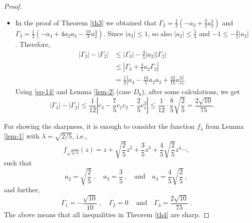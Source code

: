 \documentclass{amsart}
\begin{document}
\begin{proof}
\begin{itemize}
\medskip

  \item[(ii)]  In the proof of Theorem \ref{th3} we obtained that $\Gamma_{2}=\frac{1}{2}\left(-a_{3}+\frac{3}{2}a_{2}^{2}\right)$ and
$\Gamma_{3}=\frac{1}{2}\left(-a_{4}+4a_{2}a_{3}-\frac{10}{3}a_{2}^{3}\right)$.
Since $|a_{2}|\leq1$, so also $|a_{2}|\leq\frac54$ and $-1\leq -\frac45 |a_2|$. Therefore,
\[
\begin{split}
|\Gamma_{3}|-|\Gamma_{2}|&\leq |\Gamma_{3}|-\frac45 |a_{2}||\Gamma_{2}|\\
&\leq \left|\Gamma_{3}+\frac45 a_{2}\Gamma_{2}\right|\\
&=\frac{1}{2}\left|a_{4}-\frac{16}{5}a_{2}a_{3}+\frac{32}{15}a_{2}^{3}\right|.
\end{split}
\]
Using \eqref{eq-14} and Lemma \ref{lem-2} (case $D_{8}$), after some calculations, we get
$$|\Gamma_{3}|-|\Gamma_{2}|\leq \frac{1}{12} \left|c_{3}- \frac75c_{1}c_{2}-\frac25c_{1}^{3}\right|\leq\frac{1}{12}\cdot\frac{8}{5}\sqrt{\frac{2}{5}}=\frac{2\sqrt{10}}{75}.$$
\end{itemize}

\medskip

For showing the sharpness, it is enough to consider the function $f_\lambda$ from Lemma  \ref{lem-1} with $\lambda=\sqrt{2/5}$, i.e.,
$$f_{\sqrt{2/5}}(z)=z+\sqrt{\frac{2}{5}}z^{2}+\frac{3}{5}z^{3}+\frac45\sqrt{\frac{2}{5}}z^{4}\cdots,$$
such that
\[a_2=\sqrt{\frac{2}{5}}\ ,\quad a_3=\frac{3}{5}\ ,\quad\mbox{and} \quad  a_4=\frac45\sqrt{\frac{2}{5}}\ ,\]
and further,
\[\Gamma_1=-\frac{\sqrt{10}}{10}\ ,\quad \Gamma_2=0\, \quad\mbox{and} \quad  \Gamma_3=\frac{2\sqrt{10}}{75}\ .\]
The above means that all inequalities in Theorem \ref{th4} are sharp.
\end{proof}


\medskip
\end{document}
